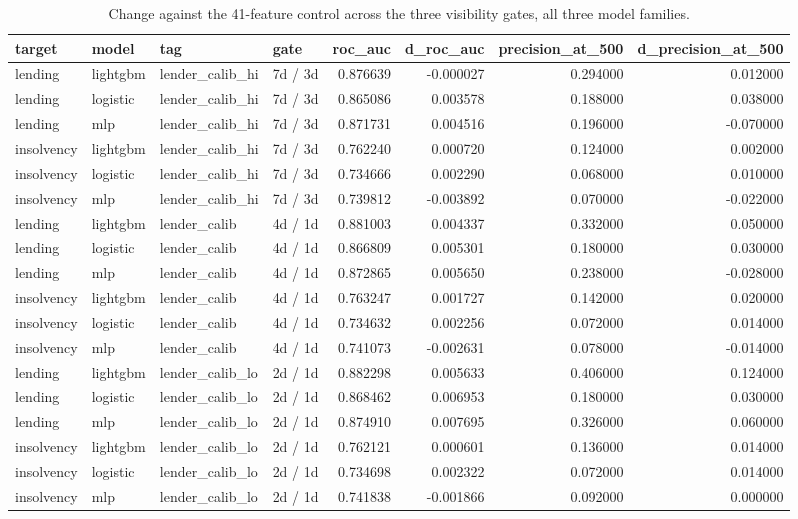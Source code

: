 \begin{table}
\caption{Change against the 41-feature control across the three visibility gates, all three model families.}
\label{tab:17_gate_ladder_all_families}
\begin{tabular}{llllrrrr}
\toprule
target & model & tag & gate & roc_auc & d_roc_auc & precision_at_500 & d_precision_at_500 \\
\midrule
lending & lightgbm & lender_calib_hi & 7d / 3d & 0.876639 & -0.000027 & 0.294000 & 0.012000 \\
lending & logistic & lender_calib_hi & 7d / 3d & 0.865086 & 0.003578 & 0.188000 & 0.038000 \\
lending & mlp & lender_calib_hi & 7d / 3d & 0.871731 & 0.004516 & 0.196000 & -0.070000 \\
insolvency & lightgbm & lender_calib_hi & 7d / 3d & 0.762240 & 0.000720 & 0.124000 & 0.002000 \\
insolvency & logistic & lender_calib_hi & 7d / 3d & 0.734666 & 0.002290 & 0.068000 & 0.010000 \\
insolvency & mlp & lender_calib_hi & 7d / 3d & 0.739812 & -0.003892 & 0.070000 & -0.022000 \\
lending & lightgbm & lender_calib & 4d / 1d & 0.881003 & 0.004337 & 0.332000 & 0.050000 \\
lending & logistic & lender_calib & 4d / 1d & 0.866809 & 0.005301 & 0.180000 & 0.030000 \\
lending & mlp & lender_calib & 4d / 1d & 0.872865 & 0.005650 & 0.238000 & -0.028000 \\
insolvency & lightgbm & lender_calib & 4d / 1d & 0.763247 & 0.001727 & 0.142000 & 0.020000 \\
insolvency & logistic & lender_calib & 4d / 1d & 0.734632 & 0.002256 & 0.072000 & 0.014000 \\
insolvency & mlp & lender_calib & 4d / 1d & 0.741073 & -0.002631 & 0.078000 & -0.014000 \\
lending & lightgbm & lender_calib_lo & 2d / 1d & 0.882298 & 0.005633 & 0.406000 & 0.124000 \\
lending & logistic & lender_calib_lo & 2d / 1d & 0.868462 & 0.006953 & 0.180000 & 0.030000 \\
lending & mlp & lender_calib_lo & 2d / 1d & 0.874910 & 0.007695 & 0.326000 & 0.060000 \\
insolvency & lightgbm & lender_calib_lo & 2d / 1d & 0.762121 & 0.000601 & 0.136000 & 0.014000 \\
insolvency & logistic & lender_calib_lo & 2d / 1d & 0.734698 & 0.002322 & 0.072000 & 0.014000 \\
insolvency & mlp & lender_calib_lo & 2d / 1d & 0.741838 & -0.001866 & 0.092000 & 0.000000 \\
\bottomrule
\end{tabular}
\end{table}
